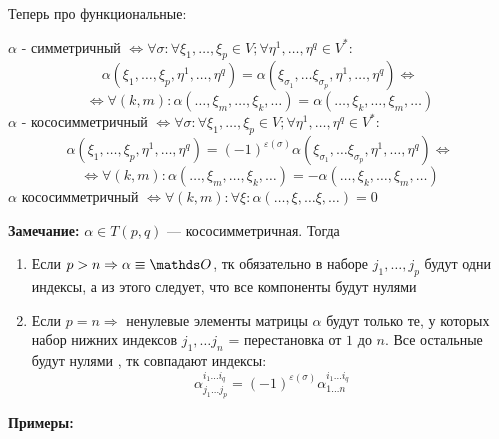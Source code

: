 Теперь про функциональные:

$\alpha$ - симметричный $\Leftrightarrow \forall \sigma: \forall \xi_1,\ldots , \xi_p \in V; \forall \eta^1,\ldots, \eta^q \in V^*: $
$$\alpha(\xi_1,\ldots, \xi_p,\eta^1,\ldots, \eta^q) = \alpha (\xi_{\sigma_1},\ldots \xi_{\sigma_p
}, \eta^1, \ldots, \eta^q) \Leftrightarrow$$
$$\Leftrightarrow \forall (k,m): \alpha(\ldots, \xi_m, \ldots,\xi_k,\ldots) = \alpha (\ldots, \xi_k,\ldots, \xi_m,\ldots)$$
$\alpha$ - кососимметричный $\Leftrightarrow \forall \sigma: \forall \xi_1,\ldots , \xi_p \in V; \forall \eta^1,\ldots, \eta^q \in V^*: $
$$\alpha(\xi_1,\ldots, \xi_p,\eta^1,\ldots, \eta^q) =(-1)^{\varepsilon(\sigma)} \alpha (\xi_{\sigma_1},\ldots \xi_{\sigma_p
}, \eta^1, \ldots, \eta^q) \Leftrightarrow$$
$$\Leftrightarrow \forall (k,m): \alpha(\ldots, \xi_m, \ldots,\xi_k,\ldots) = -\alpha (\ldots, \xi_k,\ldots, \xi_m,\ldots)$$
 $\alpha $ кососимметричный $\Leftrightarrow\forall (k,m):\forall \xi: \alpha(\ldots, \xi, \ldots \xi, \ldots ) = 0$

\textbf{Замечание:} $\alpha \in T(p,q)$ --- кососимметричная. Тогда
\begin{enumerate}
    \item Если $p>n \Rightarrow \alpha \equiv \zero$, тк обязательно в наборе $j_1,\ldots, j_p$ будут одни индексы, а из этого следует, что все компоненты будут нулями
    \item Если $p=n \Rightarrow$ ненулевые элементы матрицы $\alpha$ будут только те, у которых набор нижних индексов $j_1,\ldots j_n$ = перестановка от $1$ до $n$. Все остальные будут нулями , тк совпадают индексы:
    $$\alpha_{j_1\ldots j_p}^{i_1\ldots i_q} = (-1)^{\varepsilon(\sigma)}\alpha_{1\ldots n}^{i_1 \ldots i_q}$$
\end{enumerate}

\textbf{Примеры:}

